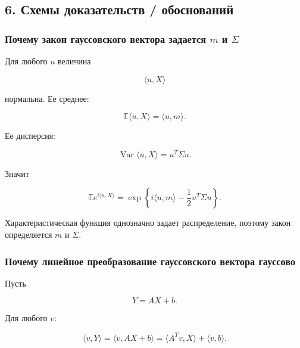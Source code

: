\documentclass[
  11pt,
  a4paper,
]{article}
\begin{document}
\subsection{6. Схемы доказательств /
обоснований}\label{ux441ux445ux435ux43cux44b-ux434ux43eux43aux430ux437ux430ux442ux435ux43bux44cux441ux442ux432-ux43eux431ux43eux441ux43dux43eux432ux430ux43dux438ux439}

\subsubsection{\texorpdfstring{Почему закон гауссовского вектора
задается \(m\) и
\(\Sigma\)}{Почему закон гауссовского вектора задается m и \textbackslash Sigma}}\label{ux43fux43eux447ux435ux43cux443-ux437ux430ux43aux43eux43d-ux433ux430ux443ux441ux441ux43eux432ux441ux43aux43eux433ux43e-ux432ux435ux43aux442ux43eux440ux430-ux437ux430ux434ux430ux435ux442ux441ux44f-m-ux438-sigma}

Для любого \(u\) величина

\[
\langle u,X\rangle
\]

нормальна. Ее среднее:

\[
\mathbb E\langle u,X\rangle=\langle u,m\rangle.
\]

Ее дисперсия:

\[
\operatorname{Var}\langle u,X\rangle=u^T\Sigma u.
\]

Значит

\[
\mathbb E e^{i\langle u,X\rangle}
=
\exp\left\{i\langle u,m\rangle-\frac12u^T\Sigma u\right\}.
\]

Характеристическая функция однозначно задает распределение, поэтому
закон определяется \(m\) и \(\Sigma\).

\subsubsection{Почему линейное преобразование гауссовского вектора
гауссово}\label{ux43fux43eux447ux435ux43cux443-ux43bux438ux43dux435ux439ux43dux43eux435-ux43fux440ux435ux43eux431ux440ux430ux437ux43eux432ux430ux43dux438ux435-ux433ux430ux443ux441ux441ux43eux432ux441ux43aux43eux433ux43e-ux432ux435ux43aux442ux43eux440ux430-ux433ux430ux443ux441ux441ux43eux432ux43e}

Пусть

\[
Y=AX+b.
\]

Для любого \(v\):

\[
\langle v,Y\rangle
=
\langle v,AX+b\rangle
=
\langle A^Tv,X\rangle+\langle v,b\rangle.
\]
\end{document}
